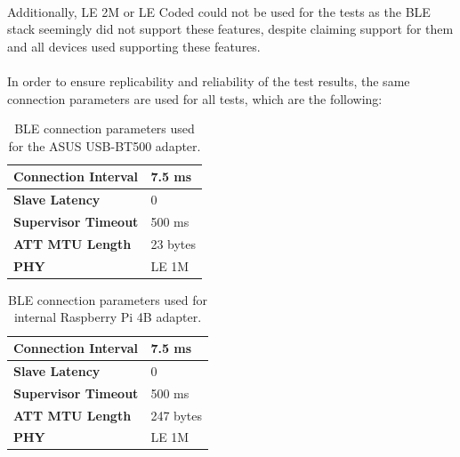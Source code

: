 \paragraph{} Additionally, LE 2M or LE Coded could not be used for the tests as the \acs{BLE} stack seemingly did not support these features, despite claiming support for them and all devices used supporting these features. %

\paragraph{} In order to ensure replicability and reliability of the test results, the same connection parameters are used for all tests, which are the following:

\begin{table}[H]
    \centering
    \caption{\acs{BLE} connection parameters used for the ASUS USB-BT500 adapter.}
    \begin{tabular}{|l|l|}
    \hline
    \textbf{Connection Interval} & 7.5 ms \\ \hline
    \textbf{Slave Latency}       & 0     \\ \hline
    \textbf{Supervisor Timeout}  & 500 ms \\ \hline
    \textbf{\acs{ATT} \acs{MTU} Length}      & 23 bytes   \\ \hline
    \textbf{\acs{PHY}}      & LE 1M   \\ \hline
    
    \end{tabular}
    \label{tab:ble-connection-values-hci1}
\end{table}

\begin{table}[H]
    \centering
    \caption{\acs{BLE} connection parameters used for internal Raspberry Pi 4B adapter.}
    \begin{tabular}{|l|l|}
    \hline
    \textbf{Connection Interval} & 7.5 ms \\ \hline
    \textbf{Slave Latency}       & 0     \\ \hline
    \textbf{Supervisor Timeout}  & 500 ms \\ \hline
    \textbf{\acs{ATT} \acs{MTU} Length}      & 247 bytes   \\ \hline
    \textbf{\acs{PHY}}      & LE 1M   \\ \hline
    \end{tabular}
    \label{tab:ble-connection-values-hci0}
\end{table}

